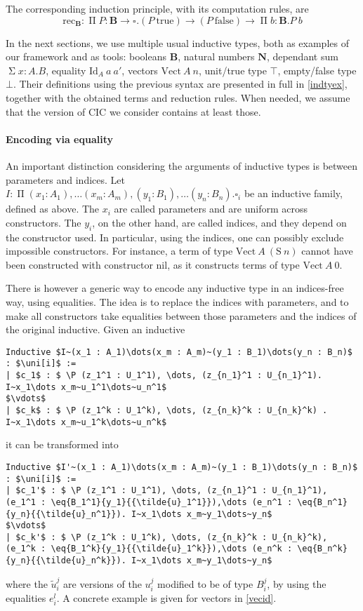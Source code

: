 \documentclass{kaobook}
\renewcommand{\mathtt}{\mathrm}
\newcommand{\uni}[1][]{\square_{#1}}
\newcommand{\red}{\mapsto}
\newcommand{\ired}{\red_\iota}
\renewcommand{\P}{\operatorname{\Pi}}
\renewcommand{\S}{\operatorname{\Sigma}}
\newcommand{\unit}{\top}
\DeclareMathOperator{\?}{?}
\newcommand{\rec}{\mathtt{rec}}
\newcommand{\bool}{\mathbf{B}}
\newcommand{\nat}{\mathbf{N}}
\newcommand{\s}{\mathtt{S}}
\newcommand{\eq}[3]{\mathtt{Id}_{#1}~#2~#3}
\newcommand{\ve}{\mathtt{Vect}}
\newcommand{\nil}{\mathtt{nil}}
\newcommand{\true}{\mathtt{true}}
\newcommand{\false}{\mathtt{false}}
\begin{document}
{The corresponding induction principle, with its computation rules, are
	\[\rec_{\bool} : \P P : \bool \to \uni. (P~\true) \to (P~\false) \to \P b : \bool. P~b\]

In the next sections, we use multiple usual inductive types, both as examples of our framework and as tools: booleans $\bool$, natural numbers $\nat$, dependant sum $\S x : A. B$, equality $\eq{A}{a}{a'}$, vectors $\ve~A~n$, unit/true type $\unit$, empty/false type $\bot$. Their definitions using the previous syntax are presented in full in \autoref{indtyex}, together with the obtained terms and reduction rules. When needed, we assume that the version of CIC we consider contains at least those.

\paragraph{Encoding via equality}

An important distinction considering the arguments of inductive types is between parameters and indices. Let $I :  \P (x_1 : A_1),\dots (x_m : A_m),(y_1 : B_1),\dots (y_n : B_n) . \uni[i]$ be an inductive family, defined as above. The $x_i$ are called parameters and are uniform across constructors. The $y_i$, on the other hand, are called indices, and they depend on the constructor used. In particular, using the indices, one can possibly exclude impossible constructors. For instance, a term of type $\ve~A~(\s~n)$ cannot have been constructed with constructor $\nil$, as it constructs terms of type $\ve~A~0$.

There is however a generic way to encode any inductive type in an indices-free way, using equalities. The idea is to replace the indices with parameters, and to make all constructors take equalities between those parameters and the indices of the original inductive. Given an inductive
\begin{lstlisting}
Inductive $I~(x_1 : A_1)\dots(x_m : A_m)~(y_1 : B_1)\dots(y_n : B_n)$ : $\uni[i]$ :=
| $c_1$ : $ \P (z_1^1 : U_1^1), \dots, (z_{n_1}^1 : U_{n_1}^1). I~x_1\dots x_m~u_1^1\dots~u_n^1$
$\vdots$
| $c_k$ : $ \P (z_1^k : U_1^k), \dots, (z_{n_k}^k : U_{n_k}^k) . I~x_1\dots x_m~u_1^k\dots~u_n^k$
\end{lstlisting}
it can be transformed into
\begin{lstlisting}
Inductive $I'~(x_1 : A_1)\dots(x_m : A_m)~(y_1 : B_1)\dots(y_n : B_n)$ : $\uni[i]$ :=
| $c_1'$ : $ \P (z_1^1 : U_1^1), \dots, (z_{n_1}^1 : U_{n_1}^1), (e_1^1 : \eq{B_1^1}{y_1}{{\tilde{u}_1^1}}),\dots (e_n^1 : \eq{B_n^1}{y_n}{{\tilde{u}_n^1}}). I~x_1\dots x_m~y_1\dots~y_n$
$\vdots$
| $c_k'$ : $ \P (z_1^k : U_1^k), \dots, (z_{n_k}^k : U_{n_k}^k), (e_1^k : \eq{B_1^k}{y_1}{{\tilde{u}_1^k}}),\dots (e_n^k : \eq{B_n^k}{y_n}{{\tilde{u}_n^k}}). I~x_1\dots x_m~y_1\dots~y_n$
\end{lstlisting}
where the $\tilde{u}_i^j$ are versions of the $u_i^j$ modified to be of type $B_i^j$, by using the equalities $e_i^l$. A concrete example is given for vectors in \autoref{vecid}.

}
\end{document}
